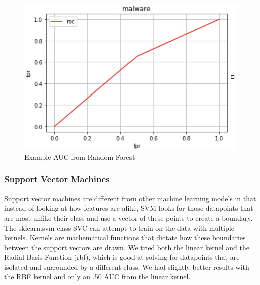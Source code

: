 \documentclass[sigconf]{acmart}
\begin{document}
 \begin{figure}
  \includegraphics[width=\linewidth]{forest.PNG}
  \caption{Example AUC from Random Forest}
  \label{fig:linear}
\end{figure}

\subsubsection{Support Vector Machines}
Support vector machines are different from other machine learning models in that instead of looking at how features are alike, SVM looks for those datapoints that are most unlike their class and use a vector of these points to create a boundary. The sklearn.svm class SVC can attempt to train on the data with multiple kernels. Kernels are mathematical functions that dictate how these boundaries between the support vectors are drawn. We tried both the linear kernel and the Radial Basis Function (rbf), which is good at solving for datapoints that are isolated and surrounded by a different class. We had slightly better results with the RBF kernel and only an .50 AUC from the linear kernel.
\end{document}
